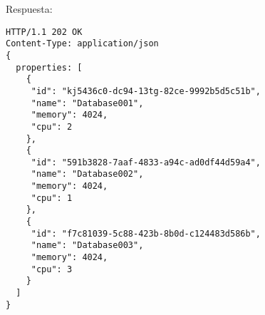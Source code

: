 \vspace{1cm}
Respuesta:
\vspace{1cm}

\begin{lstlisting}[style=json]
HTTP/1.1 202 OK
Content-Type: application/json
{
  properties: [
    {
     "id": "kj5436c0-dc94-13tg-82ce-9992b5d5c51b",
     "name": "Database001",
     "memory": 4024,
     "cpu": 2
    },
    {
     "id": "591b3828-7aaf-4833-a94c-ad0df44d59a4",
     "name": "Database002",
     "memory": 4024,
     "cpu": 1  
    },
    {
     "id": "f7c81039-5c88-423b-8b0d-c124483d586b",
     "name": "Database003",
     "memory": 4024,
     "cpu": 3  
    }
  ]  
}
\end{lstlisting}